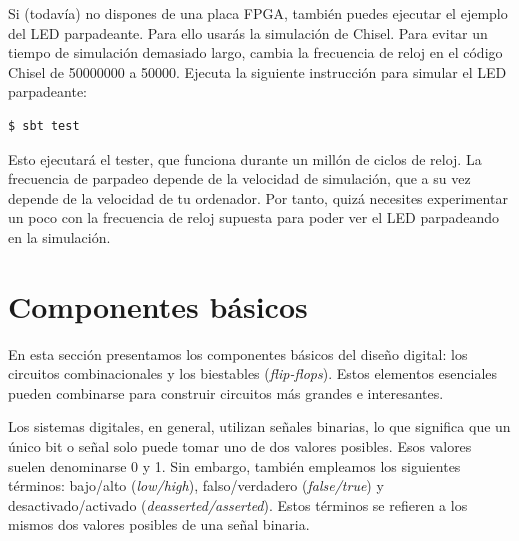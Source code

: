 \documentclass[%
    10pt,
    headinclude, footinclude=false,
    openright, %
    notitlepage,
    cleardoublepage=empty,
    headsepline,
    numbers=noenddot,
    bibliography=totoc, index=totoc,
    ]{scrbook}
\begin{document}
Si (todavía) no dispones de una placa FPGA, también puedes ejecutar el ejemplo del LED parpadeante.
Para ello usarás la simulación de Chisel. Para evitar un tiempo de simulación demasiado largo, cambia la
frecuencia de reloj en el código Chisel de 50000000 a 50000. Ejecuta la siguiente
instrucción para simular el LED parpadeante:

\begin{verbatim}
$ sbt test
\end{verbatim}


Esto ejecutará el tester, que funciona durante un millón de ciclos de reloj.
La frecuencia de parpadeo depende de la velocidad de simulación, que a su vez depende de la
velocidad de tu ordenador. Por tanto, quizá necesites experimentar un poco
con la frecuencia de reloj supuesta para poder ver el LED parpadeando en la simulación.

\chapter{Componentes básicos}


En esta sección presentamos los componentes básicos del diseño digital:
los circuitos combinacionales y los biestables (\emph{flip-flops}).
Estos elementos esenciales pueden combinarse para construir circuitos más grandes e interesantes.


Los sistemas digitales, en general, utilizan señales binarias, lo que significa que un único bit o señal
solo puede tomar uno de dos valores posibles. Esos valores suelen denominarse 0 y 1. Sin embargo,
también empleamos los siguientes términos: bajo/alto (\emph{low/high}), falso/verdadero (\emph{false/true})
y desactivado/activado (\emph{deasserted/asserted}).
Estos términos se refieren a los mismos dos valores posibles de una señal binaria.
\end{document}
